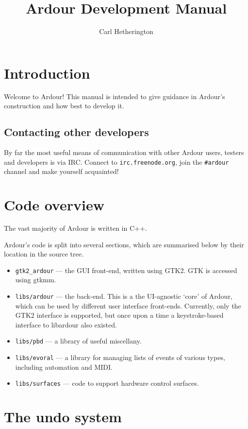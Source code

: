 \documentclass[10pt,a4paper]{book}
\title{Ardour Development Manual}
\author{Carl Hetherington}
\newcommand{\code}[1]{\texttt{#1}}
\begin{document}
\maketitle

\chapter{Introduction}

Welcome to Ardour!  This manual is intended to give guidance in
Ardour's construction and how best to develop it.

\section{Contacting other developers}

By far the most useful means of communication with other Ardour users,
testers and developers is via IRC.  Connect to
\texttt{irc.freenode.org}, join the \texttt{\#ardour} channel and make
yourself acquainted!

\chapter{Code overview}

The vast majority of Ardour is written in C++.  

Ardour's code is split into several sections, which are summarised
below by their location in the source tree.

\begin{itemize}
\item \code{gtk2\_ardour} --- the GUI front-end, written using GTK2.
  GTK is accessed using gtkmm.
\item \code{libs/ardour} --- the back-end.  This is a the UI-agnostic
  `core' of Ardour, which can be used by different user interface
  front-ends.  Currently, only the GTK2 interface is supported, but
  once upon a time a keystroke-based interface to libardour also
  existed.
\item \code{libs/pbd} --- a library of useful miscellany.
\item \code{libs/evoral} --- a library for managing lists of events of
  various types, including automation and MIDI\@.
\item \code{libs/surfaces} --- code to support hardware control
  surfaces.
\end{itemize}

\chapter{The undo system}
\end{document}
